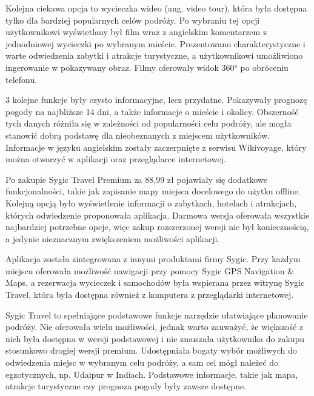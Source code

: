\documentclass[10pt,twoside,a4paper]{report}
\begin{document}
\par Kolejna ciekawa opcja to wycieczka wideo (ang. video tour), która była dostępna tylko dla bardziej popularnych celów podróży. Po wybraniu tej opcji użytkownikowi wyświetlany był film wraz z angielskim komentarzem z jednodniowej wycieczki po wybranym mieście. Prezentowano charakterystyczne i warte odwiedzenia zabytki i atrakcje turystyczne, a użytkownikowi umożliwiono ingerowanie w pokazywany obraz. Filmy oferowały widok 360° po obróceniu telefonu.
\par 3 kolejne funkcje były czysto informacyjne, lecz przydatne. Pokazywały prognozę pogody na najbliższe 14 dni, a także informacje o mieście i okolicy. Obszerność tych danych różniła się w zależności od popularności celu podróży, ale mogła stanowić dobrą podstawę dla nieobeznanych z miejscem użytkowników. Informacje w języku angielskim zostały zaczerpnięte z serwisu Wikivoyage, który można otworzyć w aplikacji oraz przeglądarce internetowej.
\par Po zakupie Sygic Travel Premium za 88,99 zł pojawiały się dodatkowe funkcjonalności, takie jak zapisanie mapy miejsca docelowego do użytku offline. Kolejną opcją było wyświetlenie informacji o zabytkach, hotelach i atrakcjach, których odwiedzenie proponowała aplikacja. Darmowa wersja oferowała wszystkie najbardziej potrzebne opcje, więc zakup rozszerzonej wersji nie był koniecznością, a jedynie nieznacznym zwiększeniem możliwości aplikacji.
\par Aplikacja została zintegrowana z innymi produktami firmy Sygic. Przy każdym miejscu oferowała możliwość nawigacji przy pomocy Sygic GPS Navigation \& Maps, a rezerwacja wycieczek i samochodów była wspierana przez witrynę Sygic Travel, która była dostępna również z komputera z przeglądarki internetowej.
\par Sygic Travel to spełniające podstawowe funkcje narzędzie ułatwiające planowanie podróży. Nie oferowała wielu możliwości, jednak warto zauważyć, że większość z nich była dostępna w wersji podstawowej i nie zmuszała użytkownika do zakupu stosunkowo drogiej wersji premium. Udostępniała bogaty wybór możliwych do odwiedzenia miejsc w wybranym celu podróży, a sam cel mógł należeć do egzotycznych, np. Udaipur w Indiach. Podstawowe informacje, takie jak mapa, atrakcje turystyczne czy prognoza pogody były zawsze dostępne. 
\end{document}
